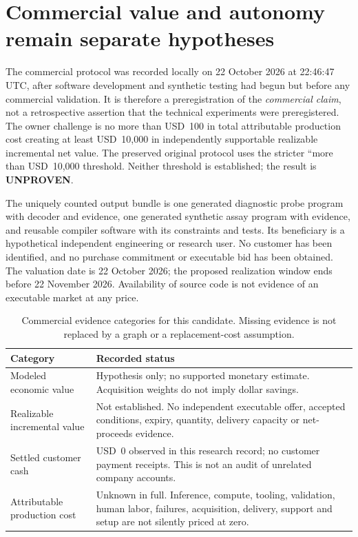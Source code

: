 \documentclass[11pt,letterpaper]{article}
\theoremstyle{definition}\newtheorem{definition}[theorem]{Definition}
\theoremstyle{remark}\newtheorem{remark}[theorem]{Remark}
\begin{document}
\section{Commercial value and autonomy remain separate hypotheses}
\label{sec:economics}
The commercial protocol was recorded locally on 22 October 2026 at 22:46:47 UTC, after software development and synthetic testing had begun but before any commercial validation. It is therefore a preregistration of the \emph{commercial claim}, not a retrospective assertion that the technical experiments were preregistered. The owner challenge is no more than USD~100 in total attributable production cost creating at least USD~10,000 in independently supportable realizable incremental net value. The preserved original protocol uses the stricter ``more than USD~10,000 threshold. Neither threshold is established; the result is \textbf{UNPROVEN}.

The uniquely counted output bundle is one generated diagnostic probe program with decoder and evidence, one generated synthetic assay program with evidence, and reusable compiler software with its constraints and tests. Its beneficiary is a hypothetical independent engineering or research user. No customer has been identified, and no purchase commitment or executable bid has been obtained. The valuation date is 22 October 2026; the proposed realization window ends before 22 November 2026. Availability of source code is not evidence of an executable market at any price.

\begin{table}[htbp]
\centering\small
\caption{Commercial evidence categories for this candidate. Missing evidence is not replaced by a graph or a replacement-cost assumption.}
\begin{tabularx}{\linewidth}{@{}P{.27\linewidth}Y@{}}
\toprule
Category & Recorded status \\
\midrule
Modeled economic value & Hypothesis only; no supported monetary estimate. Acquisition weights do not imply dollar savings. \\
Realizable incremental value & Not established. No independent executable offer, accepted conditions, expiry, quantity, delivery capacity or net-proceeds evidence. \\
Settled customer cash & USD~0 observed in this research record; no customer payment receipts. This is not an audit of unrelated company accounts. \\
Attributable production cost & Unknown in full. Inference, compute, tooling, validation, human labor, failures, acquisition, delivery, support and setup are not silently priced at zero. \\
\bottomrule
\end{tabularx}
\end{table}
\end{document}
